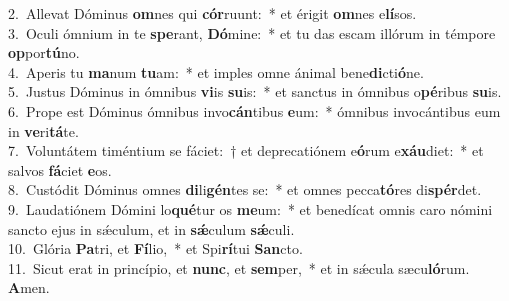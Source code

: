 {2.~}Allevat Dóminus \textbf{om}nes qui \textbf{cór}ruunt:~* et érigit \textbf{om}nes e\textbf{lí}sos.\\
{3.~}Oculi ómnium in te \textbf{spe}rant, \textbf{Dó}mine:~* et tu das escam illórum in témpore \textbf{op}por\textbf{tú}no.\\
{4.~}Aperis tu \textbf{ma}num \textbf{tu}am:~* et imples omne ánimal bene\textbf{di}cti\textbf{ó}ne.\\
{5.~}Justus Dóminus in ómnibus \textbf{vi}is \textbf{su}is:~* et sanctus in ómnibus o\textbf{pé}ribus \textbf{su}is.\\
{6.~}Prope est Dóminus ómnibus invo\textbf{cán}tibus \textbf{e}um:~* ómnibus invocántibus eum in \textbf{ve}ri\textbf{tá}te.\\
{7.~}Voluntátem timéntium se fáciet:~† et deprecatiónem e\textbf{ó}rum e\textbf{xáu}diet:~* et salvos \textbf{fá}ciet \textbf{e}os.\\
{8.~}Custódit Dóminus omnes \textbf{di}li\textbf{gén}tes se:~* et omnes pecca\textbf{tó}res di\textbf{spér}det.\\
{9.~}Laudatiónem Dómini lo\textbf{qué}tur os \textbf{me}um:~* et benedícat omnis caro nómini sancto ejus in sǽculum, et in \textbf{sǽ}culum \textbf{sǽ}culi.\\
{10.~}Glória \textbf{Pa}tri, et \textbf{Fí}lio,~* et Spi\textbf{rí}tui \textbf{San}cto.\\
{11.~}Sicut erat in princípio, et \textbf{nunc}, et \textbf{sem}per,~* et in sǽcula sæcu\textbf{ló}rum. \textbf{A}men.\\
